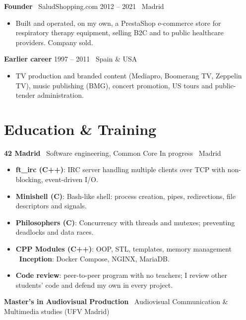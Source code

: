 \documentclass[10pt,a4paper]{article}
\newcommand{\job}[4]{%
  \par\vspace{4pt}\textbf{#1} \textperiodcentered\ #2 \hfill {\color{muted}#3 \textperiodcentered\ #4}\par}
\newcommand{\proj}[2]{\item \textbf{#1}: #2}
\begin{document}
\job{Founder}{SaludShopping.com}{2012 -- 2021}{Madrid}
\begin{itemize}
  \item Built and operated, on my own, a PrestaShop e-commerce store for respiratory therapy equipment, selling B2C and to public healthcare providers. Company sold.
\end{itemize}

\par\vspace{4pt}\textbf{Earlier career} \hfill {\color{muted}1997 -- 2011 \textperiodcentered\ Spain \& USA}\par
\begin{itemize}
  \item TV production and branded content (Mediapro, Boomerang TV, Zeppelin TV), music publishing (BMG), concert promotion, US tours and public-tender administration.
\end{itemize}

\section{Education \& Training}

\job{42 Madrid}{Software engineering, Common Core}{In progress}{Madrid}
\begin{itemize}
  \proj{ft\_irc (C++)}{IRC server handling multiple clients over TCP with non-blocking, event-driven I/O.}
  \proj{Minishell (C)}{Bash-like shell: process creation, pipes, redirections, file descriptors and signals.}
  \proj{Philosophers (C)}{Concurrency with threads and mutexes; preventing deadlocks and data races.}
  \proj{CPP Modules (C++)}{OOP, STL, templates, memory management} \textperiodcentered\ \textbf{Inception}: Docker Compose, NGINX, MariaDB.
  \item \textbf{Code review}: peer-to-peer program with no teachers; I review other students' code and defend my own in every project.
\end{itemize}

\par\vspace{4pt}\textbf{Master's in Audiovisual Production} \textperiodcentered\ Audiovisual Communication \& Multimedia studies (UFV Madrid)  %
\end{document}
